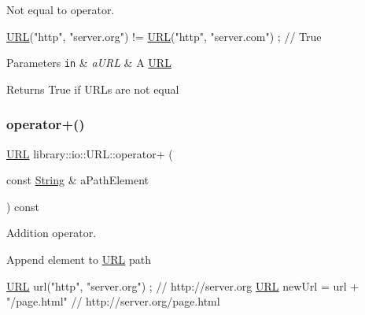 Not equal to operator. 


\begin{DoxyCode}
\hyperlink{classlibrary_1_1io_1_1_u_r_l_a7e9c070138a6dbd000ffb10b7cd8a5c4}{URL}(\textcolor{stringliteral}{"http"}, \textcolor{stringliteral}{"server.org"}) != \hyperlink{classlibrary_1_1io_1_1_u_r_l_a7e9c070138a6dbd000ffb10b7cd8a5c4}{URL}(\textcolor{stringliteral}{"http"}, \textcolor{stringliteral}{"server.com"}) ; \textcolor{comment}{// True}
\end{DoxyCode}



\begin{DoxyParams}[1]{Parameters}
\mbox{\tt in}  & {\em a\+U\+RL} & A \hyperlink{classlibrary_1_1io_1_1_u_r_l}{U\+RL} \\
\hline
\end{DoxyParams}
\begin{DoxyReturn}{Returns}
True if U\+R\+Ls are not equal 
\end{DoxyReturn}
\mbox{\label{classlibrary_1_1io_1_1_u_r_l_a2c82adf72f893fed983610e4cba0b42f}} 
\subsubsection{\texorpdfstring{operator+()}{operator+()}}
{\footnotesize\ttfamily \hyperlink{classlibrary_1_1io_1_1_u_r_l}{U\+RL} library\+::io\+::\+U\+R\+L\+::operator+ (\begin{DoxyParamCaption}\item[{const \hyperlink{namespacelibrary_1_1io_a7469b45835a4421045db344d6a5a1f85}{String} \&}]{a\+Path\+Element }\end{DoxyParamCaption}) const}



Addition operator. 

Append element to \hyperlink{classlibrary_1_1io_1_1_u_r_l}{U\+RL} path


\begin{DoxyCode}
\hyperlink{classlibrary_1_1io_1_1_u_r_l_a7e9c070138a6dbd000ffb10b7cd8a5c4}{URL} url(\textcolor{stringliteral}{"http"}, \textcolor{stringliteral}{"server.org"}) ; \textcolor{comment}{// http://server.org}
\hyperlink{classlibrary_1_1io_1_1_u_r_l_a7e9c070138a6dbd000ffb10b7cd8a5c4}{URL} newUrl = url + \textcolor{stringliteral}{"/page.html"} \textcolor{comment}{// http://server.org/page.html}
\end{DoxyCode}




